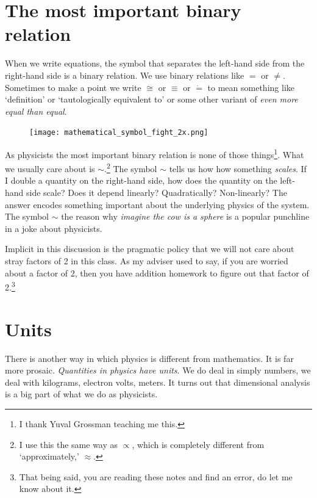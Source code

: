 \documentclass[
  11pt,
	colorful,
	raggedright,
]{tufte-style-thesis-flip}
\begin{document}
\section{The most important binary relation}

When we write equations, the symbol that separates the left-hand side from the right-hand side is a binary relation. We use binary relations like $=$ or $\neq$. Sometimes to make a point we write $\cong$ or $\equiv$ or $\dot =$ to mean something like `definition’ or `tautologically equivalent to’ or some other variant of \emph{even more equal than equal}. 

 \begin{figure}[h]
      \texttt{[image: mathematical\_symbol\_fight\_2x.png]} %
  \end{figure}

As physicists the most important binary relation is none of those things\footnote{I thank Yuval Grossman teaching me this.}. What we usually care about is  $\sim$.\footnote{I use this the same way as $\propto$, which is completely different from `approximately,’ $\approx$.} The symbol $\sim$ tells us how how something \emph{scales}. If I double a quantity on the right-hand side, how does the quantity on the left-hand side scale? Does it depend linearly? Quadratically? Non-linearly? The answer encodes something important about the underlying physics of the system. The symbol $\sim$ the reason why \emph{imagine the cow is a sphere} is a popular punchline in a joke about physicists. 


Implicit in this discussion is the pragmatic policy that we will not care about stray factors of 2 in this class. As my adviser used to say, if you are worried about a factor of 2, then you have addition homework to figure out that factor of 2.\footnote{That being said, you are reading these notes and find an error, do let me know about it.} 

\section{Units}

There is another way in which physics is different from mathematics. It is far more prosaic. \emph{Quantities in physics have units}. We do deal in simply numbers, we deal with kilograms, electron volts, meters. It turns out that dimensional analysis is a big part of what we do as physicists. 
\end{document}
